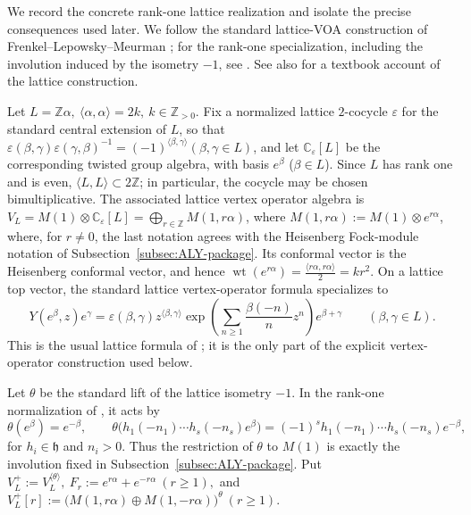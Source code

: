 \documentclass[12pt,leqno]{amsart}
\numberwithin{equation}{section} \newtheorem{thm}{Theorem}[section] \newtheorem{lem}[thm]{Lemma} \newtheorem{ex}[thm]{Example} \newtheorem{prop}[thm]{Proposition} \newtheorem{cor}[thm]{Corollary} \newtheorem{defi}[thm]{Definition} \newtheorem{rmk}[thm]{Remark} \newtheorem{notation}[thm]{Notation}
\newcommand{\wt}{\operatorname{wt}}
\def\Z{\mathbb{Z}} \def\N{\mathbb{N}} \def\A{\mathbb{A}} \def\C{\mathbb{C}} \def\R{\mathbb{R}} \def\Q{\mathbb{Q}} \def\F{\mathbb{F}}
\begin{document}
We record the concrete rank-one lattice realization and isolate the precise consequences used later. We follow the standard lattice-VOA construction of Frenkel--Lepowsky--Meurman \cite[Chapter~8]{FLM}; for the rank-one specialization, including the involution induced by the isometry $-1$, see \cite[Section~2]{DG98}. See also \cite[Sections~6.4--6.5]{LepowskyLi} for a textbook account of the lattice construction.

Let \(L=\Z\alpha,\ \langle\alpha,\alpha\rangle=2k,\ k\in\Z_{>0}.\) Fix a normalized lattice $2$-cocycle $\varepsilon$ for the standard central extension of $L$, so that \(\varepsilon(\beta,\gamma)\varepsilon(\gamma,\beta)^{-1} =(-1)^{\langle\beta,\gamma\rangle} (\beta,\gamma\in L)\), and let $\C_\varepsilon[L]$ be the corresponding twisted group algebra, with basis $e^\beta$ ($\beta\in L$). Since $L$ has rank one and is even, $\langle L,L\rangle\subset 2\Z$; in particular, the cocycle may be chosen bimultiplicative. The associated lattice vertex operator algebra is \(V_L=M(1)\otimes\C_\varepsilon[L]=\bigoplus_{r\in\Z}M(1,r\alpha)\), where \(M(1,r\alpha):=M(1)\otimes e^{r\alpha}\), where, for $r\ne0$, the last notation agrees with the Heisenberg Fock-module notation of Subsection~\ref{subsec:ALY-package}. Its conformal vector is the Heisenberg conformal vector, and hence \(\wt(e^{r\alpha})=\frac{\langle r\alpha,r\alpha\rangle}{2}=kr^2.\) On a lattice top vector, the standard lattice vertex-operator formula specializes to
\begin{equation*}
Y(e^\beta,z)e^\gamma
=
\varepsilon(\beta,\gamma)
 z^{\langle\beta,\gamma\rangle}
 \exp\!\left(\sum_{n\ge1}\frac{\beta(-n)}{n}z^n\right)
 e^{\beta+\gamma}
\qquad(\beta,\gamma\in L).
\end{equation*}
This is the usual lattice formula of \cite[Chapter~8]{FLM}; it is the only part of the explicit vertex-operator construction used below.

Let $\theta$ be the standard lift of the lattice isometry $-1$. In the rank-one normalization of \cite[Section~2]{DG98}, it acts by
\[
\theta(e^\beta)=e^{-\beta},\qquad
\theta\bigl(h_1(-n_1)\cdots h_s(-n_s)e^\beta\bigr)
=(-1)^s h_1(-n_1)\cdots h_s(-n_s)e^{-\beta},
\]
for $h_i\in\mathfrak h$ and $n_i>0$. Thus the restriction of $\theta$ to $M(1)$ is exactly the involution fixed in Subsection~\ref{subsec:ALY-package}. Put \(V_L^+:=V_L^{\langle\theta\rangle},\ F_r:=e^{r\alpha}+e^{-r\alpha}\ (r\ge1),\) and \(V_L^+[r]:=\bigl(M(1,r\alpha)\oplus M(1,-r\alpha)\bigr)^\theta\ (r\ge1).\)
\end{document}
